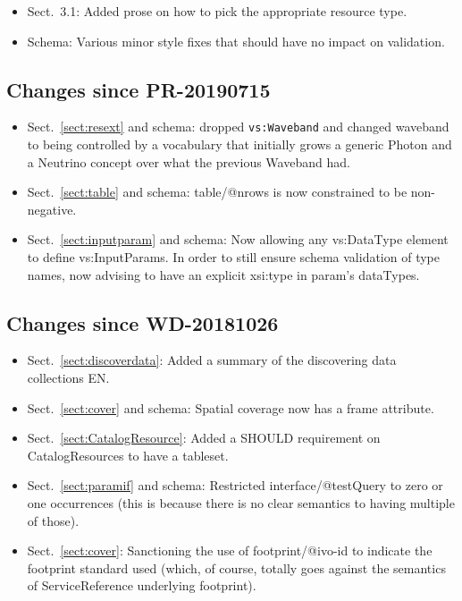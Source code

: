 \documentclass[11pt,a4paper]{ivoa}
\begin{document}
\begin{itemize}
\item Sect.~3.1: Added prose on how to pick the appropriate resource
type.
\item Schema: Various minor style fixes that should have no impact on
validation.
\end{itemize}

\subsection{Changes since PR-20190715}

\begin{itemize}
\item Sect.~\ref{sect:resext} and schema: 
dropped \verb|vs:Waveband| and changed waveband to being
controlled by a vocabulary that initially grows a generic Photon and a
Neutrino concept over what the previous Waveband had.
\item Sect.~\ref{sect:table} and schema: table/@nrows is now constrained to be non-negative.
\item Sect.~\ref{sect:inputparam} and schema:
Now allowing any vs:DataType element to define vs:InputParams.
In order to still ensure schema validation of type names,
now advising to have an explicit xsi:type in param's dataTypes.
\end{itemize}

\subsection{Changes since  WD-20181026}

\begin{itemize}
\item Sect.~\ref{sect:discoverdata}: 
Added a summary of the discovering data collections EN.
\item Sect.~\ref{sect:cover} and schema: 
Spatial coverage now has a frame attribute.
\item Sect.~\ref{sect:CatalogResource}: 
Added a SHOULD requirement on CatalogResources to 
have a tableset.
\item Sect.~\ref{sect:paramif} and schema: 
Restricted interface/@testQuery to zero or one occurrences (this
is because there is no clear semantics to having multiple of those).
\item Sect.~\ref{sect:cover}:
Sanctioning the use of footprint/@ivo-id to indicate the footprint 
standard used (which, of course, totally goes against the semantics of
ServiceReference underlying footprint).
\end{itemize}
\end{document}
